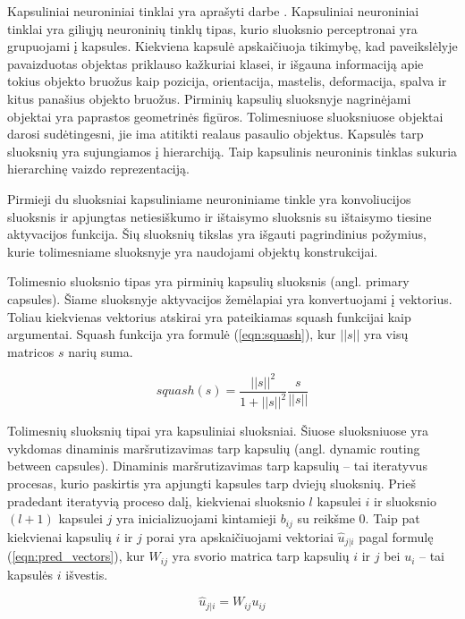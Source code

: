 Kapsuliniai neuroniniai tinklai yra aprašyti darbe \cite{capsNet}. Kapsuliniai neuroniniai tinklai yra giliųjų neuroninių tinklų tipas, kurio sluoksnio perceptronai yra grupuojami į kapsules. Kiekviena kapsulė apskaičiuoja tikimybę, kad paveikslėlyje pavaizduotas objektas priklauso kažkuriai klasei, ir išgauna informaciją apie tokius objekto bruožus kaip pozicija, orientacija, mastelis, deformacija, spalva ir kitus panašius objekto bruožus. Pirminių kapsulių sluoksnyje nagrinėjami objektai yra paprastos geometrinės figūros. Tolimesniuose sluoksniuose objektai darosi sudėtingesni, jie ima atitikti realaus pasaulio objektus. Kapsulės tarp sluoksnių yra sujungiamos į hierarchiją. Taip kapsulinis neuroninis tinklas sukuria hierarchinę vaizdo reprezentaciją.

Pirmieji du sluoksniai kapsuliniame neuroniniame tinkle yra konvoliucijos sluoksnis ir apjungtas netiesiškumo ir ištaisymo sluoksnis su ištaisymo tiesine aktyvacijos funkcija. Šių sluoksnių tikslas yra išgauti pagrindinius požymius, kurie tolimesniame sluoksnyje yra naudojami objektų konstrukcijai.

Tolimesnio sluoksnio tipas yra pirminių kapsulių sluoksnis (angl. primary capsules). Šiame sluoksnyje aktyvacijos žemėlapiai yra konvertuojami į vektorius. Toliau kiekvienas vektorius atskirai yra pateikiamas squash funkcijai kaip argumentai. Squash funkcija yra formulė (\ref{eqn:squash}), kur $||s||$ yra visų matricos $s$ narių suma.

\begin{equation}
\label{eqn:squash}
	squash(s) = \dfrac{||s||^2}{1 + ||s||^2}\dfrac{s}{||s||}
\end{equation}

Tolimesnių sluoksnių tipai yra kapsuliniai sluoksniai. Šiuose sluoksniuose yra vykdomas dinaminis maršrutizavimas tarp kapsulių (angl. dynamic routing between capsules). Dinaminis maršrutizavimas tarp kapsulių -- tai iteratyvus procesas, kurio paskirtis yra apjungti kapsules tarp dviejų sluoksnių. Prieš pradedant iteratyvią proceso dalį, kiekvienai sluoksnio $l$ kapsulei $i$ ir sluoksnio $(l + 1)$ kapsulei $j$ yra inicializuojami kintamieji $b_{ij}$ su reikšme 0. Taip pat kiekvienai kapsulių $i$ ir $j$ porai yra apskaičiuojami vektoriai $\hat{u}_{j|i}$ pagal formulę (\ref{eqn:pred_vectors}), kur $W_{ij}$ yra svorio matrica tarp kapsulių $i$ ir $j$ bei $u_{i}$ -- tai kapsulės $i$ išvestis.

\begin{equation}
\label{eqn:pred_vectors}
	\hat{u}_{j|i} = W_{ij} u_{ij}
\end{equation}

